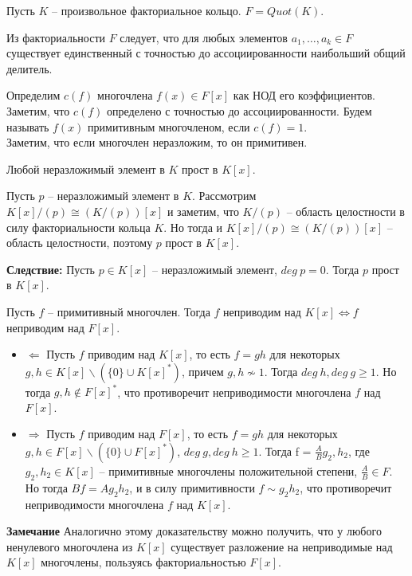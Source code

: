Пусть $K$ -- произвольное факториальное кольцо. $F = Quot(K)$.

Из факториальности $F$ следует, что для любых элементов $a_1, \ldots, a_k \in F$ существует единственный с точностью до ассоциированности наибольший общий делитель. 

Определим $c(f)$ многочлена $f(x) \in F[x]$ как НОД его коэффициентов. Заметим, что $c(f)$ определено с точностью до ассоциированности. Будем называть $f(x)$ примитивным многочленом, если $c(f) = 1$.\\

Заметим, что если многочлен неразложим, то он примитивен.

\Statement Любой неразложимый элемент в $K$ прост в $K[x]$.

\Proof
Пусть $p$ -- неразложимый элемент в $K$. Рассмотрим $K[x]/(p) \cong (K/(p))[x]$ и заметим, что $K/(p)$ -- область целостности в силу факториальности кольца $K$. Но тогда и $K[x]/(p) \cong (K/(p))[x]$ -- область целостности, поэтому $p$ прост в $K[x]$.
\EndProof

\textbf{Следствие:} Пусть $p \in K[x]$ -- неразложимый элемент, $deg \ p = 0$. Тогда $p$ прост в $K[x]$.

\Statement Пусть $f$ -- примитивный многочлен. Тогда $f$ неприводим над $K[x] \Leftrightarrow f$ неприводим над $F[x]$.

\Proof
\begin{itemize}
    \item $\Leftarrow$ Пусть $f$ приводим над $K[x]$, то есть $f = gh$ для некоторых $g,h \in K[x] \backslash (\{0\} \cup K[x]^*)$, причем $g, h \not\sim 1$. Тогда $deg \ h, deg \ g \geq 1$. Но тогда $g, h \not\in F[x]^*$, что противоречит неприводимости многочлена $f$ над $F[x]$.
    
    \item  $\Rightarrow$ Пусть $f$ приводим над $F[x]$, то есть $f = gh$ для некоторых  $g,h \in F[x] \backslash (\{0\} \cup F[x]^*)$, $deg \ g, deg \ h \geq 1$. Тогда f = $\frac{A}{B}g_2, h_2$, где $g_2, h_2 \in K[x]$ -- примитивные многочлены положительной степени,  $\frac{A}{B} \in F$. Но тогда $Bf = Ag_2h_2$, и в силу примитивности $f \sim g_2h_2$, что противоречит неприводимости многочлена $f$ над $K[x]$.
\end{itemize}
\EndProof

\textbf{Замечание} Аналогично этому доказательству можно получить, что у любого ненулевого многочлена из $K[x]$ существует разложение на неприводимые над $K[x]$ многочлены, пользуясь факториальностью $F[x]$.\\

